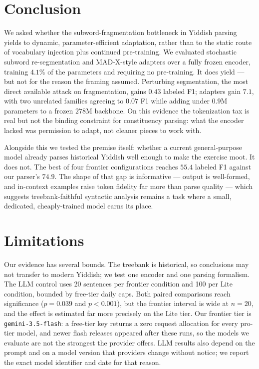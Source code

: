 \documentclass[11pt]{article}
\begin{document}
\section{Conclusion}

We asked whether the subword-fragmentation bottleneck in Yiddish parsing yields
to dynamic, parameter-efficient adaptation, rather than to the static route of
vocabulary injection plus continued pre-training. We evaluated stochastic subword
re-segmentation and MAD-X-style adapters over a fully frozen encoder, training
$4.1\%$ of the parameters and requiring no pre-training. It does yield --- but not
for the reason the framing assumed. Perturbing segmentation, the most direct
available attack on fragmentation, gains $0.43$ labeled F1; adapters gain $7.1$,
with two unrelated families agreeing to $0.07$ F1 while adding under $0.9$M
parameters to a frozen $278$M backbone. On this evidence the tokenization tax is real but not the binding
constraint for constituency parsing: what the encoder lacked was permission to
adapt, not cleaner pieces to work with.

Alongside this we tested the premise itself: whether a current general-purpose
model already parses historical Yiddish well enough to make the exercise moot. It
does not. The best of four frontier configurations reaches $55.4$ labeled F1
against our parser's $74.9$. The shape of that gap is informative --- output is
well-formed, and in-context examples raise token fidelity far more than parse
quality --- which suggests treebank-faithful syntactic analysis remains a task
where a small, dedicated, cheaply-trained model earns its place.

\section*{Limitations}
Our evidence has several bounds. The treebank is historical, so conclusions may
not transfer to modern Yiddish; we test one encoder and one parsing formalism.
The LLM control uses 20 sentences per frontier condition and 100 per Lite
condition, bounded by free-tier daily caps. Both paired comparisons reach
significance ($p=0.039$ and $p<0.001$), but the frontier interval is wide at
$n{=}20$, and the effect is estimated far more precisely on the Lite tier. Our
frontier tier is \texttt{gemini-3.5-flash}: a free-tier key returns a zero
request allocation for every pro-tier model, and newer flash releases appeared
after these runs, so the models we evaluate are not the strongest the provider
offers. LLM results also depend on the prompt and on a model version that
providers change without notice; we report the exact model identifier and date
for that reason.
\end{document}
